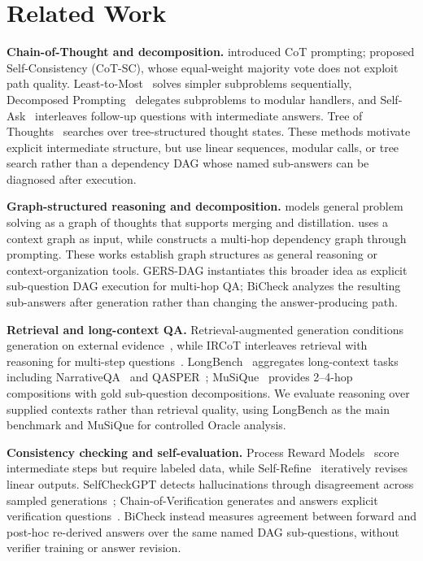 \documentclass[letterpaper]{article} %
\begin{document}
\section{Related Work}

\noindent\textbf{Chain-of-Thought and decomposition.} \citet{wei2022cot} introduced CoT prompting; \citet{wang2023sc} proposed Self-Consistency (CoT-SC), whose equal-weight majority vote does not exploit path quality. Least-to-Most~\citep{zhou2023leasttomost} solves simpler subproblems sequentially, Decomposed Prompting~\citep{khot2023decomposed} delegates subproblems to modular handlers, and Self-Ask~\citep{press2023selfask} interleaves follow-up questions with intermediate answers. Tree of Thoughts~\citep{yao2023tot} searches over tree-structured thought states. These methods motivate explicit intermediate structure, but use linear sequences, modular calls, or tree search rather than a dependency DAG whose named sub-answers can be diagnosed after execution.

\noindent\textbf{Graph-structured reasoning and decomposition.} \citet{besta2024got} models general problem solving as a graph of thoughts that supports merging and distillation. \citet{han2025rwg} uses a context graph as input, while \citet{oruche2025modegraph} constructs a multi-hop dependency graph through prompting. These works establish graph structures as general reasoning or context-organization tools. GERS-DAG instantiates this broader idea as explicit sub-question DAG execution for multi-hop QA; BiCheck analyzes the resulting sub-answers after generation rather than changing the answer-producing path.

\noindent\textbf{Retrieval and long-context QA.} Retrieval-augmented generation conditions generation on external evidence~\citep{lewis2020rag}, while IRCoT interleaves retrieval with reasoning for multi-step questions~\citep{trivedi2023ircot}. LongBench~\citep{bai2024longbench} aggregates long-context tasks including NarrativeQA~\citep{kocisky2018narrativeqa} and QASPER~\citep{dasigi2021qasper}; MuSiQue~\citep{trivedi2022musique} provides 2--4-hop compositions with gold sub-question decompositions. We evaluate reasoning over supplied contexts rather than retrieval quality, using LongBench as the main benchmark and MuSiQue for controlled Oracle analysis.

\noindent\textbf{Consistency checking and self-evaluation.} Process Reward Models~\citep{lightman2024verify} score intermediate steps but require labeled data, while Self-Refine~\citep{madaan2023selfrefine} iteratively revises linear outputs. SelfCheckGPT detects hallucinations through disagreement across sampled generations~\citep{manakul2023selfcheckgpt}; Chain-of-Verification generates and answers explicit verification questions~\citep{dhuliawala2024cov}. BiCheck instead measures agreement between forward and post-hoc re-derived answers over the same named DAG sub-questions, without verifier training or answer revision.
\end{document}

